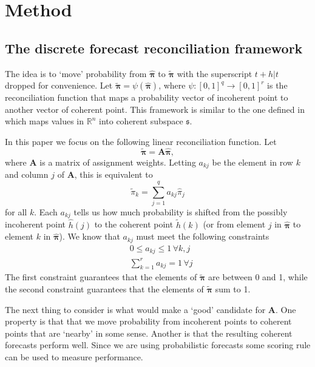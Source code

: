 \documentclass[a4paper,review,12pt,authoryear]{elsarticle}
\newcommand{\bpi}{\bm{\pi}}
\begin{document}
\section{Method}
\label{sec:method}

    \subsection{The discrete forecast reconciliation framework}
    
    The idea is to `move' probability from $\hat{\bpi}$ to $\tilde{\bpi}$ with the superscript $t+h|t$ dropped for convenience.  
    Let $\tilde{\bpi} = \psi(\hat{\bpi})$, where $\psi:[0,1]^q \rightarrow [0,1]^r$ is the reconciliation function that maps a probability vector of incoherent point to another vector of coherent point. 
    This framework is similar to the one defined in \cite{anagiotelisForecastReconciliationGeometric2021} which maps values in $\mathbb{R}^n$ into coherent subspace $\mathfrak{s}$.

    In this paper we focus on the following linear reconciliation function.
    Let
    \begin{equation}
      \label{eq:framework}
    \tilde{\bpi}=\bm{A}\hat{\bpi},
    \end{equation}
    where $\bm{A}$ is a matrix of assignment weights. Letting $a_{kj}$ be the element in row $k$ and column $j$ of $\bm{A}$, this is equivalent to
    \[
      \tilde{\pi}_k=\sum\limits_{j=1}^q a_{kj}\hat{{\pi}}_j
    \]
    for all $k$. 
    Each $a_{kj}$ tells us how much probability is shifted from the possibly incoherent point $\hat{h}(j)$ to the coherent point $\tilde{h}(k)$ (or from element $j$ in $\hat{\bpi}$ to element $k$ in $\hat{\bpi}$). We know that $a_{kj}$ must meet the following constraints
    \begin{align*}
    &0\leq a_{kj} \leq 1 \,\forall k, j\\ 
    &\sum\limits_{k=1}^r a_{kj} = 1 \,\forall j 
    \end{align*}
    The first constraint guarantees that the elements of $\tilde{\bpi}$ are between 0 and 1, while the second constraint guarantees that the elements of $\tilde{\bpi}$ sum to 1.
    
    The next thing to consider is what would make a `good' candidate for $\bm{A}$.  One property is that that we move probability from incoherent points to coherent points that are  `nearby' in some sense. Another is that the resulting coherent forecasts perform well.  Since we are using probabilistic forecasts some scoring rule can be used to measure performance.
    
\end{document}
